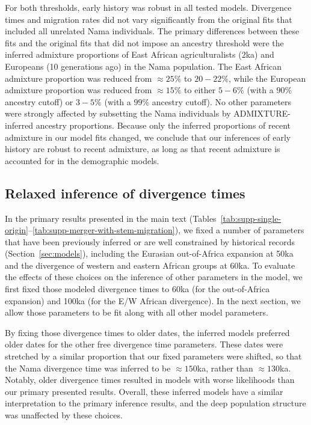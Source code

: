 \documentclass[]{article}
\begin{document}
For both thresholds, early history was robust in all tested models. Divergence
times and migration rates did not vary significantly from the original fits
that included all unrelated Nama individuals. The primary differences between
these fits and the original fits that did not impose an ancestry threshold were
the inferred admixture proportions of East African agriculturalists (2ka) and
Europeans (10 generations ago) in the Nama population. The East African
admixture proportion was reduced from $\approx 25\%$ to $20-22\%$, while the
European admixture proportion was reduced from $\approx 15\%$ to either $5-6\%$
(with a $90\%$ ancestry cutoff) or $3-5\%$ (with a $99\%$ ancestry cutoff). No
other parameters were strongly affected by subsetting the Nama individuals by
ADMIXTURE-inferred ancestry proportions. Because only the inferred proportions
of recent admixture in our model fits changed, we conclude that our inferences
of early history are robust to recent admixture, as long as that recent
admixture is accounted for in the demographic models.

\subsection{Relaxed inference of divergence times}
\label{sec:change-dates}

In the primary results presented in the main text
(Tables~\ref{tab:supp-single-origin}--\ref{tab:supp-merger-with-stem-migration}),
we fixed a number of parameters that have been previously inferred or are well
constrained by historical records (Section~\ref{sec:models}), including the
Eurasian out-of-Africa expansion at 50ka and the divergence of western and
eastern African groups at 60ka. To evaluate the effects of these choices on the
inference of other parameters in the model, we first fixed those modeled
divergence times to 60ka (for the out-of-Africa expansion) and 100ka (for the
E/W African divergence). In the next section, we allow those parameters to be
fit along with all other model parameters.

By fixing those divergence times to older dates, the inferred models preferred
older dates for the other free divergence time parameters. These dates were
stretched by a similar proportion that our fixed parameters were shifted, so
that the Nama divergence time was inferred to be $\approx150$ka, rather than
$\approx130$ka. Notably, older divergence times resulted in models with worse
likelihoods than our primary presented results. Overall, these inferred models
have a similar interpretation to the primary inference results, and the deep
population structure was unaffected by these choices.
\end{document}
